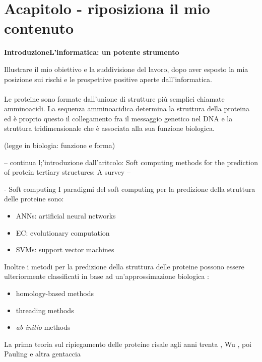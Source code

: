 \chapter{Acapitolo - riposiziona il mio contenuto}


\textbf{{\LARGE Introduzione\newline\newline L'informatica: un potente strumento}}
\vspace{1cm}

Illustrare il mio obiettivo e la suddivisione del lavoro, dopo aver esposto la mia posizione sui rischi e le prospettive positive aperte dall'informatica.\\\\


Le proteine sono formate dall'unione di strutture più semplici chiamate amminoacidi. La sequenza amminoacidica determina la struttura della proteina ed è proprio questo il collegamento fra il messaggio genetico nel DNA e la struttura tridimensionale che è associata alla sua funzione biologica.

(legge in biologia: funzione e forma)

-- continua l;'introduzione dall'aritcolo: Soft computing methods for the prediction of protein tertiary
structures: A survey --



- Soft computing
I paradigmi del soft computing per la predizione della struttura delle proteine sono:
\begin{itemize}
\item ANNs: artificial neural networks
\item EC: evolutionary computation
\item SVMs: support vector machines
\end{itemize}
Inoltre i metodi per la predizione della struttura delle proteine possono essere ulteriormente classificati in base ad un'approssimazione biologica \cite{marquez2015soft}:
\begin{itemize}
	\item homology-based methods
	\item threading methods
	\item \textit{ab initio } methods
\end{itemize}

La prima teoria sul ripiegamento delle proteine risale agli anni trenta , Wu \cite{wu1931studies}, poi Pauling e altra gentaccia

